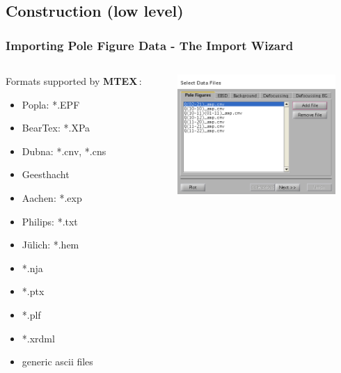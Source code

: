 \documentclass{beamer}
\newcommand{\MTEX}{{\bf {\color{red}M}TEX\,}}%
\begin{document}
\subsection*{Construction (low level)}



\begin{frame}[fragile]
  \frametitle{Importing Pole Figure Data - The Import Wizard}

  \begin{columns}

    \begin{column}{6cm}
      Formats supported by \MTEX:
      \begin{itemize}
      \item Popla: *.EPF
      \item BearTex: *.XPa
      \item Dubna: *.cnv, *.cns
      \item Geesthacht
      \item Aachen: *.exp
      \item Philips: *.txt
      \item J\"ulich: *.hem
      \item *.nja
      \item *.ptx
      \item *.plf
      \item *.xrdml
      \item generic ascii files
      \end{itemize}


    \end{column}
    

    \begin{column}{6cm}
      \includegraphics[width=6cm]{pic/iw}
    \end{column}

  \end{columns}

\end{frame}
\end{document}
